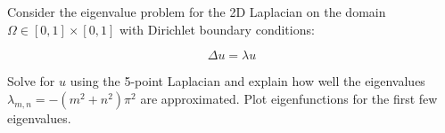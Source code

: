Consider the eigenvalue problem for the 2D Laplacian on the domain $\Omega \in [0, 1] \times [0, 1]$ with Dirichlet
boundary conditions:

$$
\Delta u = \lambda u
$$

Solve for $u$ using the 5-point Laplacian and explain how well the eigenvalues $\lambda_{m,n} = -(m^2 + n^2)\pi^2$ are
approximated. Plot eigenfunctions for the first few eigenvalues.

\begin{solution}\ \\\\
    \ \\
\end{solution}